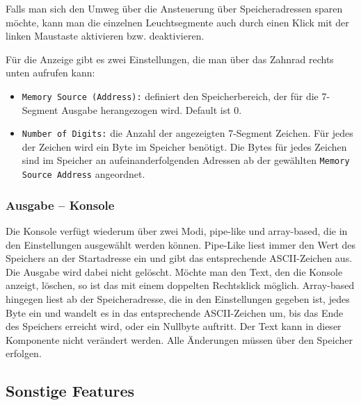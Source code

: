 Falls man sich den Umweg über die Ansteuerung über Speicheradressen sparen möchte,
kann man die einzelnen Leuchtsegmente auch durch einen Klick mit der linken Maustaste aktivieren bzw. deaktivieren.

Für die Anzeige gibt es zwei Einstellungen, die man über das Zahnrad rechts unten aufrufen kann:\\
\begin{itemize}
\item \texttt{Memory Source (Address):} definiert den Speicherbereich, der für die 7-Segment Ausgabe herangezogen wird. Default ist 0.
\item \texttt{Number of Digits:} die Anzahl der angezeigten 7-Segment Zeichen. Für jedes der Zeichen wird ein Byte im Speicher benötigt.
					Die Bytes für jedes Zeichen sind im Speicher an aufeinanderfolgenden Adressen ab der gewählten  \texttt{Memory Source Address} angeordnet.
\end{itemize}



\subsubsection{Ausgabe -- Konsole}
Die Konsole verfügt wiederum über zwei Modi, pipe-like und array-based, die in den Einstellungen ausgewählt werden können. Pipe-Like liest immer den Wert des Speichers an der Startadresse ein und gibt das entsprechende ASCII-Zeichen aus. Die Ausgabe wird dabei nicht gelöscht. Möchte man den Text, den die Konsole anzeigt, löschen, so ist das mit einem doppelten Rechtsklick möglich.
Array-based hingegen liest ab der Speicheradresse, die in den Einstellungen gegeben ist, jedes Byte ein und wandelt es in das entsprechende ASCII-Zeichen um, bis das Ende des Speichers erreicht wird, oder ein Nullbyte auftritt. Der Text kann in dieser Komponente nicht verändert werden. Alle Änderungen müssen über den Speicher erfolgen.

\subsection{Sonstige Features}
